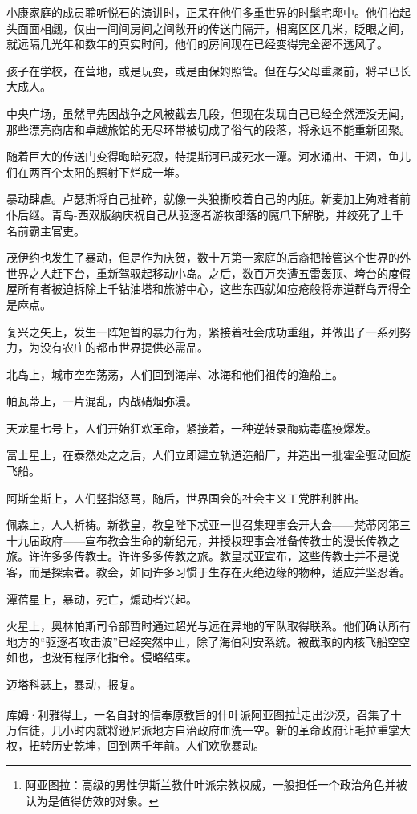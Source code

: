 \documentclass[AutoFakeBold=true]{book}
\begin{document}
小康家庭的成员聆听悦石的演讲时，正呆在他们多重世界的时髦宅邸中。他们抬起头面面相觑，仅由一间间房间之间敞开的传送门隔开，相离区区几米，眨眼之间，就远隔几光年和数年的真实时间，他们的房间现在已经变得完全密不透风了。

孩子在学校，在营地，或是玩耍，或是由保姆照管。但在与父母重聚前，将早已长大成人。

中央广场，虽然早先因战争之风被截去几段，但现在发现自己已经全然湮没无闻，那些漂亮商店和卓越旅馆的无尽环带被切成了俗气的段落，将永远不能重新团聚。

随着巨大的传送门变得晦暗死寂，特提斯河已成死水一潭。河水涌出、干涸，鱼儿们在两百个太阳的照射下烂成一堆。

暴动肆虐。卢瑟斯将自己扯碎，就像一头狼撕咬着自己的内脏。新麦加上殉难者前仆后继。青岛-西双版纳庆祝自己从驱逐者游牧部落的魔爪下解脱，并绞死了上千名前霸主官吏。

茂伊约也发生了暴动，但是作为庆贺，数十万第一家庭的后裔把接管这个世界的外世界之人赶下台，重新驾驭起移动小岛。之后，数百万突遭五雷轰顶、垮台的度假屋所有者被迫拆除上千钻油塔和旅游中心，这些东西就如痘疮般将赤道群岛弄得全是麻点。

复兴之矢上，发生一阵短暂的暴力行为，紧接着社会成功重组，并做出了一系列努力，为没有农庄的都市世界提供必需品。

北岛上，城市空空荡荡，人们回到海岸、冰海和他们祖传的渔船上。

帕瓦蒂上，一片混乱，内战硝烟弥漫。

天龙星七号上，人们开始狂欢革命，紧接着，一种逆转录酶病毒瘟疫爆发。

富士星上，在泰然处之之后，人们立即建立轨道造船厂，并造出一批霍金驱动回旋飞船。

阿斯奎斯上，人们竖指怒骂，随后，世界国会的社会主义工党胜利胜出。

佩森上，人人祈祷。新教皇，教皇陛下忒亚一世召集理事会开大会——梵蒂冈第三十九届政府——宣布教会生命的新纪元，并授权理事会准备传教士的漫长传教之旅。许许多多传教士。许许多多传教之旅。教皇忒亚宣布，这些传教士并不是说客，而是探索者。教会，如同许多习惯于生存在灭绝边缘的物种，适应并坚忍着。

潭蓓星上，暴动，死亡，煽动者兴起。

火星上，奥林帕斯司令部暂时通过超光与远在异地的军队取得联系。他们确认所有地方的``驱逐者攻击波''已经突然中止，除了海伯利安系统。被截取的内核飞船空空如也，也没有程序化指令。侵略结束。

迈塔科瑟上，暴动，报复。

库姆·利雅得上，一名自封的信奉原教旨的什叶派阿亚图拉\footnote{阿亚图拉：高级的男性伊斯兰教什叶派宗教权威，一般担任一个政治角色并被认为是值得仿效的对象。}走出沙漠，召集了十万信徒，几小时内就将逊尼派地方自治政府血洗一空。新的革命政府让毛拉重掌大权，扭转历史乾坤，回到两千年前。人们欢欣暴动。
\end{document}
